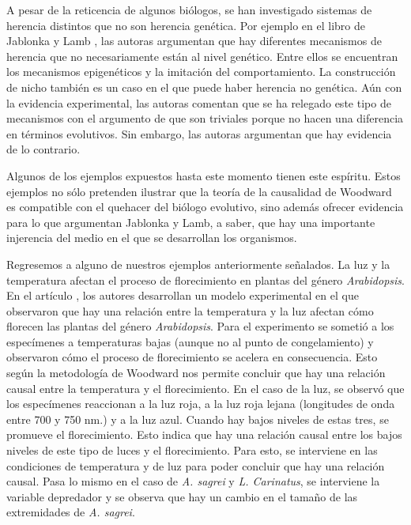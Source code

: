 A pesar de la reticencia de algunos biólogos, se han investigado sistemas de herencia distintos que no son herencia genética. Por ejemplo en el libro de Jablonka y Lamb \citeyear{Jablonka2020}, las autoras argumentan que hay diferentes mecanismos de herencia que no necesariamente están al nivel genético. Entre ellos se encuentran los mecanismos epigenéticos y la imitación del comportamiento. La construcción de nicho también es un caso en el que puede haber herencia no genética. Aún con la evidencia experimental, las autoras comentan que se ha relegado este tipo de mecanismos con el argumento de que son triviales porque no hacen una diferencia en términos evolutivos. Sin embargo, las autoras argumentan que hay evidencia de lo contrario.

Algunos de los ejemplos expuestos hasta este momento tienen este espíritu. Estos ejemplos no sólo pretenden ilustrar que la teoría de la causalidad de Woodward es compatible con el quehacer del biólogo evolutivo, sino además ofrecer evidencia para lo que argumentan Jablonka y Lamb, a saber, que hay una importante injerencia del medio en el que se desarrollan los organismos.

Regresemos a alguno de nuestros ejemplos anteriormente señalados. La luz y la temperatura afectan el proceso de florecimiento en plantas del género \emph{Arabidopsis}. En el artículo \cite{AusinEnviro}, los autores desarrollan un modelo experimental en el que observaron que hay una relación entre la temperatura y la luz afectan cómo florecen las plantas del género \emph{Arabidopsis}. Para el experimento se sometió a los especímenes a temperaturas bajas (aunque no al punto de congelamiento) y observaron cómo el proceso de florecimiento se acelera en consecuencia. Esto según la metodología de Woodward nos permite concluir que hay una relación causal entre la temperatura y el florecimiento. En el caso de la luz, se observó que los especímenes reaccionan a la luz roja, a la luz roja lejana (longitudes de onda entre 700 y 750 nm.) y a la luz azul. Cuando hay bajos niveles de estas tres, se promueve el florecimiento. Esto indica que hay una relación causal entre los bajos niveles de este tipo de luces y el florecimiento. Para esto, se interviene en las condiciones de temperatura y de luz para poder concluir que hay una relación causal. Pasa lo mismo en el caso de \emph{A. sagrei} y \emph{L. Carinatus}, se interviene la variable depredador y se observa que hay un cambio en el tamaño de las extremidades de \emph{A. sagrei}.

